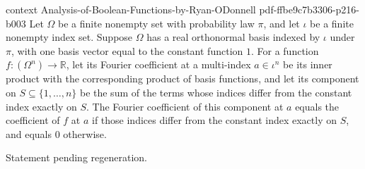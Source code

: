 \begin{theorem}
  {context}
  {Analysis-of-Boolean-Functions-by-Ryan-ODonnell}
  {pdf-ffbe9c7b3306-p216-b003}
Let $\Omega$ be a finite nonempty set with probability law $\pi$, and let $\iota$ be a
finite nonempty index set. Suppose $\Omega$ has a real orthonormal basis indexed by
$\iota$ under $\pi$, with one basis vector equal to the constant function $1$. For a
function $f:(\Omega^n)\to\mathbb R$, let its Fourier coefficient at a multi-index
$a\in\iota^n$ be its inner product with the corresponding product of basis functions,
and let its component on $S\subseteq\{1,\ldots,n\}$ be the sum of the terms whose
indices differ from the constant index exactly on $S$. The Fourier coefficient of this
component at $a$ equals the coefficient of $f$ at $a$ if those indices differ from the
constant index exactly on $S$, and equals $0$ otherwise.
\end{theorem}

\begin{theorem}
\label{FABL.FiniteFourierBasis.orthogonalComponent_dependsOnly}
\leanok
{}
Statement pending regeneration.
\end{theorem}

